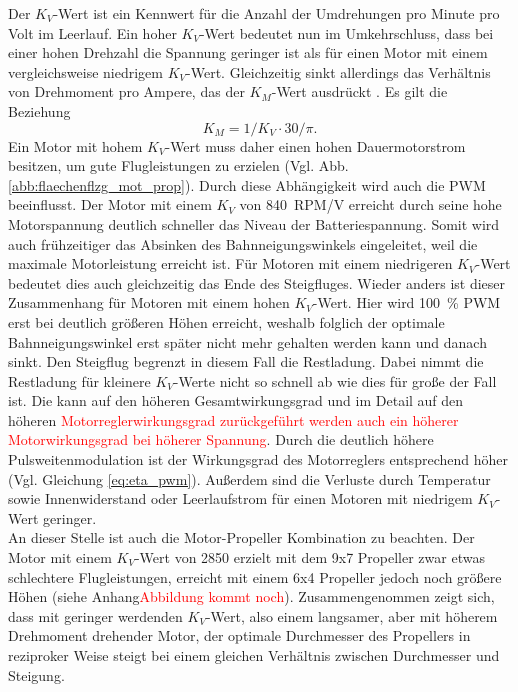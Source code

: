 Der \ensuremath{K_V}-Wert ist ein Kennwert für die Anzahl der Umdrehungen pro Minute pro Volt im Leerlauf. Ein hoher \ensuremath{K_V}-Wert bedeutet nun im Umkehrschluss, dass bei einer hohen Drehzahl die Spannung geringer ist als für einen Motor mit einem vergleichsweise niedrigem \ensuremath{K_V}-Wert. Gleichzeitig sinkt allerdings das Verhältnis von Drehmoment pro Ampere, das der \ensuremath{K_M}-Wert ausdrückt  \cite[S.35 und S.42-43]{Buchi.2013}. Es gilt die Beziehung
\begin{equation}
	K_M = 1/K_V\cdot 30/\pi.
\end{equation}
Ein Motor mit hohem \ensuremath{K_V}-Wert muss daher einen hohen Dauermotorstrom besitzen, um gute Flugleistungen zu erzielen (Vgl. Abb. \ref{abb:flaechenflzg_mot_prop}). Durch diese Abhängigkeit wird auch die PWM beeinflusst. Der Motor mit einem \ensuremath{K_V} von \SI{840}{RPM/V} erreicht durch seine hohe Motorspannung deutlich schneller das Niveau der Batteriespannung. Somit wird auch frühzeitiger das Absinken des Bahnneigungswinkels eingeleitet, weil die maximale Motorleistung erreicht ist. Für Motoren mit einem niedrigeren \ensuremath{K_V}-Wert bedeutet dies auch gleichzeitig das Ende des Steigfluges. Wieder anders ist dieser Zusammenhang für Motoren mit einem hohen \ensuremath{K_V}-Wert. Hier wird \SI{100}{\%} PWM erst bei deutlich größeren Höhen erreicht, weshalb folglich der optimale Bahnneigungswinkel erst später nicht mehr gehalten werden kann und danach sinkt. Den Steigflug begrenzt in diesem Fall die Restladung. Dabei nimmt die Restladung für kleinere \ensuremath{K_V}-Werte nicht so schnell ab wie dies für große der Fall ist. Die kann auf den höheren Gesamtwirkungsgrad und im Detail auf den höheren \textcolor{red}{Motorreglerwirkungsgrad zurückgeführt werden auch ein höherer Motorwirkungsgrad bei höherer Spannung}. Durch die deutlich höhere Pulsweitenmodulation ist der Wirkungsgrad des Motorreglers entsprechend höher (Vgl. Gleichung \ref{eq:eta_pwm}). Außerdem sind die Verluste durch Temperatur  sowie Innenwiderstand oder Leerlaufstrom für einen Motoren mit niedrigem \ensuremath{K_V}-Wert geringer.\\
An dieser Stelle ist auch die Motor-Propeller Kombination zu beachten. Der Motor mit einem \ensuremath{K_V}-Wert von 2850 erzielt mit dem 9x7 Propeller zwar etwas schlechtere Flugleistungen, erreicht mit einem 6x4 Propeller jedoch noch größere Höhen (siehe Anhang\textcolor{red}{Abbildung kommt noch}). Zusammengenommen zeigt sich, dass mit geringer werdenden \ensuremath{K_V}-Wert, also einem langsamer, aber mit höherem Drehmoment drehender Motor, der optimale Durchmesser des Propellers in reziproker Weise steigt bei einem gleichen Verhältnis zwischen Durchmesser und Steigung. %

